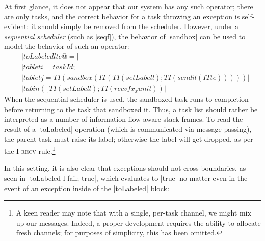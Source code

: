 At first glance, it does not appear that our system has any such operator;
there are only tasks, and the correct behavior for a task throwing
an exception is self-evident: it should simply be removed from the scheduler.
However, under a \emph{sequential scheduler} (such as |seqf|),
the behavior of |sandbox|
can be used to model the behavior of such an operator:
\begin{align*}
    & |toLabeled l te @= | \\
    & |tab let i = taskId; | \\
    & |tab let j = TI (sandbox (IT (TI (setLabel l); TI (send i l (IT te)))))| \\
    & |tab in (\ _ . TI (setLabel l); TI (recvf x _ x unit))|
\end{align*}
When the sequential scheduler is used, the sandboxed task runs to
completion before returning to the task that sandboxed it.  Thus,
a task list should rather be interpreted as a number of information flow
aware stack frames.  To read the result of a |toLabeled| operation
(which is communicated via message passing), the parent task must raise
its label; otherwise the label will get dropped, as per the \textsc{I-recv} rule.\footnote{A keen reader may note that with a single, per-task
channel, we might mix up our messages.  Indeed, a proper development requires
the ability to allocate fresh channels; for purposes of simplicity, this
has been omitted.}

In this setting, it is also clear that exceptions should not cross boundaries,
as seen in |toLabeled l fail; true|, which evaluates to |true| no matter even in
the event of an exception inside of the |toLabeled| block:


